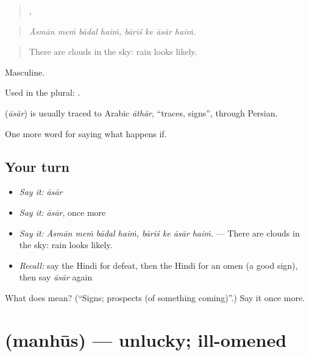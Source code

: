 \begin{quote}
   ,    
\end{quote}

\begin{quote}
\emph{Āsmān meṁ bādal haiṁ, bāriś ke āsār haiṁ.}
\end{quote}

\begin{quote}
There are clouds in the sky: rain looks likely.
\end{quote}

Masculine.

Used in the plural:    .

\begin{cousinweb}
\textbf{} (\emph{āsār}) is usually traced to Arabic \emph{āthār}, \textquotedblleft{}traces, signs\textquotedblright{}, through Persian.
\end{cousinweb}

\begin{grammarlens}[title={What you've built}]
One more word for saying what happens if.
\end{grammarlens}

\subsection*{Your turn}
\begin{itemize}
\raggedright
  \item \emph{Say it:} \emph{āsār}
  \item \emph{Say it:} \emph{āsār}, once more
  \item \emph{Say it:} \emph{Āsmān meṁ bādal haiṁ, bāriś ke āsār haiṁ.} — There are clouds in the sky: rain looks likely.
  \item \emph{Recall:} say the Hindi for defeat, then the Hindi for an omen (a good sign), then say \emph{āsār} again
\end{itemize}

\begin{tcolorbox}[breakable,colback=teal!4,colframe=teal!35!black,title={Before you move on}]
What does  mean? (\textquotedblleft{}Signs; prospects (of something coming)\textquotedblright{}.) Say it once more.
\end{tcolorbox}
\section[\texorpdfstring{\hi{मनहूस} (manhūs)}{मनहूस (manhūs)}]{ (manhūs) — unlucky; ill-omened}

